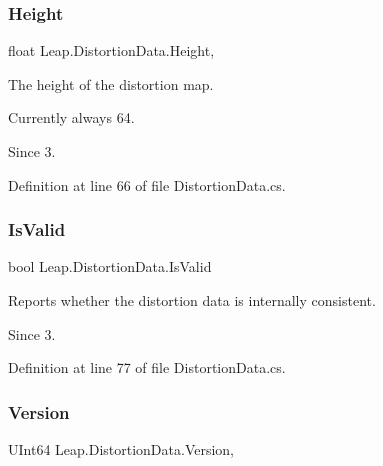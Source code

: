 \subsubsection{\texorpdfstring{Height}{Height}}
{\footnotesize\ttfamily float Leap.\+Distortion\+Data.\+Height\hspace{0.3cm}{\ttfamily [get]}, {\ttfamily [set]}}



The height of the distortion map. 

Currently always 64. \begin{DoxySince}{Since}
3. 
\end{DoxySince}


Definition at line 66 of file Distortion\+Data.\+cs.

\mbox{\label{class_leap_1_1_distortion_data_aeb36d5a10f923ea3067bce076c69e3fd}} 
\subsubsection{\texorpdfstring{IsValid}{IsValid}}
{\footnotesize\ttfamily bool Leap.\+Distortion\+Data.\+Is\+Valid\hspace{0.3cm}{\ttfamily [get]}}



Reports whether the distortion data is internally consistent. 

\begin{DoxySince}{Since}
3. 
\end{DoxySince}


Definition at line 77 of file Distortion\+Data.\+cs.

\mbox{\label{class_leap_1_1_distortion_data_a60b1ec4aa610af0fcf89a78df52b9c17}} 
\subsubsection{\texorpdfstring{Version}{Version}}
{\footnotesize\ttfamily U\+Int64 Leap.\+Distortion\+Data.\+Version\hspace{0.3cm}{\ttfamily [get]}, {\ttfamily [set]}}



